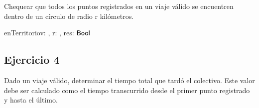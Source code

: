 \documentclass[a4paper]{article}
\begin{document}
Chequear que todos los puntos registrados en un viaje válido se encuentren dentro de un círculo de radio r kilómetros.

\begin{proc}{enTerritorio}{\In v: \viaje, \In r: \dist, \Out res: $\mathsf{Bool}$}{}


\end{proc}

\pagebreak

\subsection{Ejercicio 4}

Dado un viaje válido, determinar el tiempo total que tardó el colectivo. Este valor debe ser calculado como el tiempo transcurrido desde el primer punto registrado y hasta el último.
\end{document}
